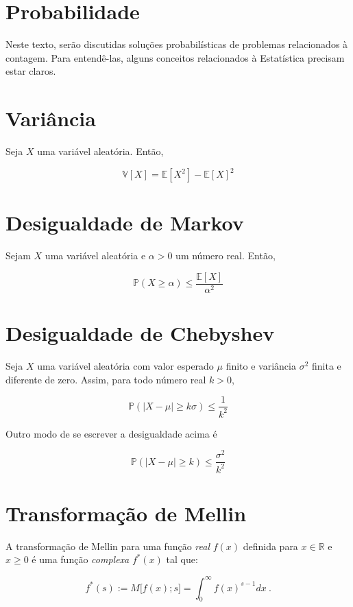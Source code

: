 \newpage
\section{Probabilidade}

Neste texto, serão discutidas soluções probabilísticas de problemas relacionados à contagem. Para entendê-las, alguns
conceitos relacionados à Estatística precisam estar claros.

\section{Variância}
\label{ap:variance}

Seja $X$ uma variável aleatória. Então,

\[ \mathbb{V}[X] = \mathbb{E}[X^2] - \mathbb{E}[X]^2\]

\section{Desigualdade de Markov}
\label{ap:markov}

Sejam $X$ uma variável aleatória e $\alpha > 0$ um número real. Então,

\[ \mathbb{P}(X \geq \alpha) \leq \frac{\mathbb{E}[X]}{\alpha^2}\]


\section{Desigualdade de Chebyshev}
\label{ap:chebyshev}

Seja $X$ uma variável aleatória com valor esperado $\mu$ finito e variância $\sigma^2$ finita e diferente de zero. 
Assim, para todo número real $k > 0$, 

\[ \mathbb{P}(| X - \mu| \geq k\sigma) \leq \frac{1}{k^2}\]

Outro modo de se escrever a desigualdade acima é 

\[ \mathbb{P}(| X - \mu| \geq k) \leq \frac{\sigma^2}{k^2} \]

\section{Transformação de Mellin}
\label{ap:mellin}

A transformação de Mellin para uma função \textit{real} $f(x)$ definida para $x \in \mathbb{R}$ e $x \geq 0$ é uma função 
\textit{complexa} $f^{*}(x)$ tal que:

\[ f^{*}(s) := M\big[f(x); s\big] = \int_{0}^{\infty} f(x)^{s-1} dx \ .\]